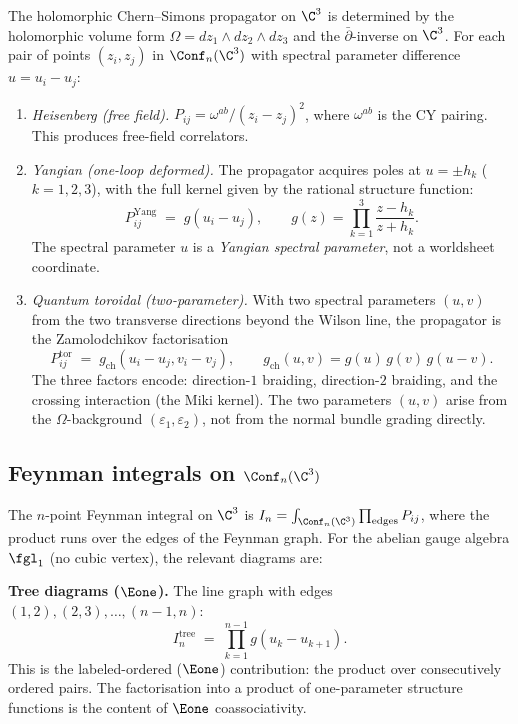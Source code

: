 The holomorphic Chern--Simons propagator on $\C^3$ is determined by the holomorphic volume form $\Omega = dz_1 \wedge dz_2 \wedge dz_3$ and the $\bar{\partial}$-inverse on $\C^3$. For each pair of points $(z_i, z_j)$ in $\Conf_n(\C^3)$ with spectral parameter difference $u = u_i - u_j$:
\begin{enumerate}[label=(\roman*)]
 \item \emph{Heisenberg (free field).} $P_{ij} = \omega^{ab}/(z_i - z_j)^2$, where $\omega^{ab}$ is the CY pairing. This produces free-field correlators.
 \item \emph{Yangian (one-loop deformed).} The propagator acquires poles at $u = \pm h_k$ ($k = 1, 2, 3$), with the full kernel given by the rational structure function:
 \begin{equation}\label{eq:propagator-yangian-c3}
 P_{ij}^{\mathrm{Yang}} \;=\; g(u_i - u_j), \qquad
 g(z) = \prod_{k=1}^3 \frac{z - h_k}{z + h_k}.
 \end{equation}
 The spectral parameter $u$ is a \emph{Yangian spectral parameter}, not a worldsheet coordinate.
 \item \emph{Quantum toroidal (two-parameter).} With two spectral parameters $(u, v)$ from the two transverse directions beyond the Wilson line, the propagator is the Zamolodchikov factorisation
 \begin{equation}\label{eq:propagator-toroidal-c3}
 P_{ij}^{\mathrm{tor}} \;=\; g_{\mathrm{ch}}(u_i - u_j, v_i - v_j),
 \qquad g_{\mathrm{ch}}(u, v) = g(u)\, g(v)\, g(u - v).
 \end{equation}
 The three factors encode: direction-$1$ braiding, direction-$2$ braiding, and the crossing interaction (the Miki kernel). The two parameters $(u, v)$ arise from the $\Omega$-background $(\varepsilon_1, \varepsilon_2)$, not from the normal bundle grading directly.
\end{enumerate}


\subsection{Feynman integrals on \texorpdfstring{$\Conf_n(\C^3)$}{Conf-n(C-3)}}
\label{subsec:feynman-conf-c3}

The $n$-point Feynman integral on $\C^3$ is $I_n = \int_{\Conf_n(\C^3)} \prod_{\mathrm{edges}} P_{ij}$, where the product runs over the edges of the Feynman graph. For the abelian gauge algebra $\fgl_1$ (no cubic vertex), the relevant diagrams are:

\medskip\noindent\textbf{Tree diagrams ($\Eone$).} The line graph with edges $(1,2), (2,3), \ldots, (n-1, n)$:
\begin{equation}\label{eq:tree-integral}
 I_n^{\mathrm{tree}} \;=\; \prod_{k=1}^{n-1} g(u_k - u_{k+1}).
\end{equation}
This is the labeled-ordered ($\Eone$) contribution: the product over consecutively ordered pairs. The factorisation into a product of one-parameter structure functions is the content of $\Eone$ coassociativity.

